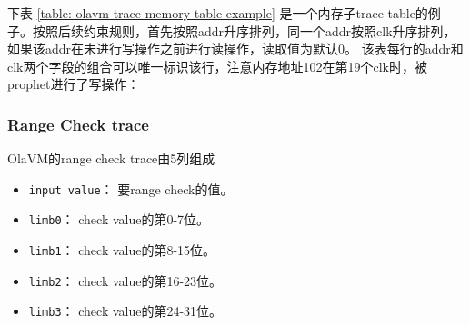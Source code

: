\begin{table}[!ht]
    \centering {}
    \caption{OlaVM的trace表结构}
    \label{table: olavm-trace-memory-table}
\end{table}

下表 \ref{table: olavm-trace-memory-table-example} 是一个内存子trace table的例子。按照后续约束规则，首先按照addr升序排列，同一个addr按照clk升序排列，如果该addr在未进行写操作之前进行读操作，读取值为默认0。
该表每行的addr和clk两个字段的组合可以唯一标识该行，注意内存地址102在第19个clk时，被prophet进行了写操作：

\begin{table}[!ht]
    \centering {}
    \caption{OlaVM的memory trace表例子}
    \label{table: olavm-trace-memory-table-example}
\end{table}

\subsubsection{Range Check trace}\label{subsubsec: olavm-trace-range-check}
OlaVM的range check trace由5列组成
\begin{itemize}
    \item \verb|input value|： 要range check的值。
    \item \verb|limb0|： check value的第0-7位。
    \item \verb|limb1|： check value的第8-15位。
    \item \verb|limb2|： check value的第16-23位。
    \item \verb|limb3|： check value的第24-31位。
\end{itemize}


